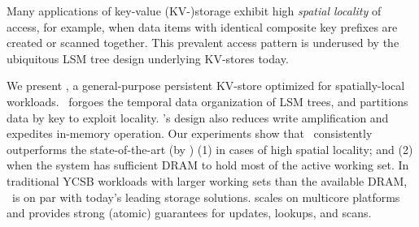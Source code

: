 Many applications of key-value (KV-)storage exhibit high \emph{spatial locality}
of access, for example, when data items with identical composite key prefixes are created or scanned together.  
This prevalent access pattern is underused by the ubiquitous LSM tree design underlying KV-stores today.

We present \sys, a general-purpose persistent KV-store optimized for spatially-local workloads. 
\sys\ forgoes the temporal data organization of LSM trees, and partitions data by key to exploit locality. 
%
\sys's design also reduces write amplification and expedites in-memory operation.
Our experiments show that \sys\ consistently outperforms the state-of-the-art (by  )
(1)  in cases of high spatial locality; and (2) when the system has sufficient DRAM to hold most of the active working set. 
In traditional YCSB workloads with larger working sets than the available  DRAM, \sys\ is on par with 
today's leading storage solutions.
\sys\/ scales on multicore platforms and provides strong (atomic) guarantees for updates, lookups, and scans. 
